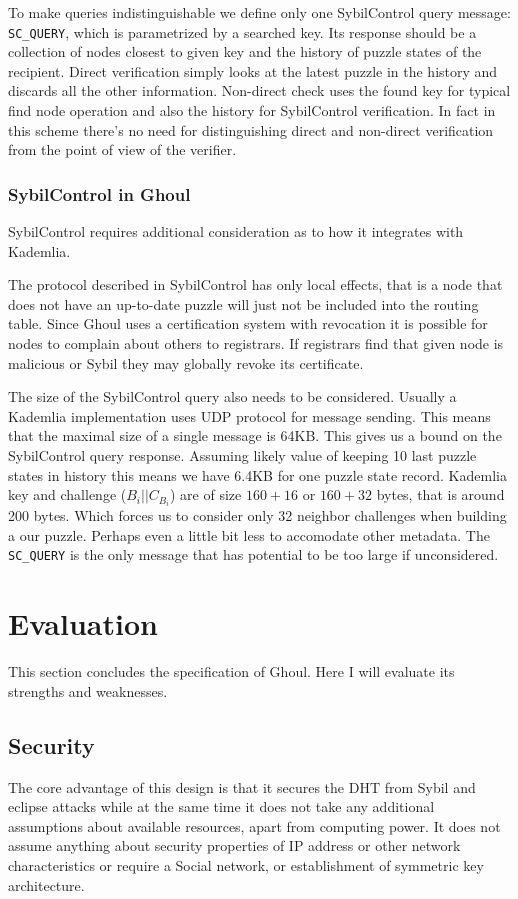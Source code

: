   To make queries indistinguishable we define only one SybilControl query
  message: \texttt{SC\_QUERY}, which is parametrized by a searched key. Its
  response should be a collection of nodes closest to given key and the history
  of puzzle states of the recipient. Direct verification simply looks at the
  latest puzzle in the history and discards all the other information.
  Non-direct check uses the found key for typical find node operation and also
  the history for SybilControl verification. In fact in this scheme there's no
  need for distinguishing direct and non-direct verification from the point of
  view of the verifier.

\subsubsection{SybilControl in Ghoul}
  SybilControl requires additional consideration as to how it integrates with
  Kademlia.

  The protocol described in SybilControl has only local effects, that is a node
  that does not have an up-to-date puzzle will just not be included into the
  routing table. Since Ghoul uses a certification system with revocation it is
  possible for nodes to complain about others to registrars. If registrars find
  that given node is malicious or Sybil they may globally revoke its
  certificate.

  The size of the SybilControl query also needs to be considered. Usually a
  Kademlia implementation uses UDP protocol for message sending. This means that
  the maximal size of a single message is 64KB. This gives us a bound on the
  SybilControl query response. Assuming likely value of keeping 10 last puzzle
  states in history this means we have 6.4KB for one puzzle state record.
  Kademlia key and challenge ($B_i || C_{B_i}$) are of size $160 + 16$ or $160
  + 32$ bytes, that is around 200 bytes. Which forces us to consider only 32
  neighbor challenges when building a our puzzle. Perhaps even a little bit
  less to accomodate other metadata. The \texttt{SC\_QUERY} is the only message
  that has potential to be too large if unconsidered.

\section{Evaluation}
  This section concludes the specification of Ghoul. Here I will evaluate its
  strengths and weaknesses.
  
  \subsection{Security}
  The core advantage of this design is that it secures the DHT from Sybil and
  eclipse attacks while at the same time it does not take any additional
  assumptions about available resources, apart from computing power. It does not
  assume anything about security properties of IP address or other network
  characteristics or require a Social network, or establishment of symmetric key
  architecture.
  
